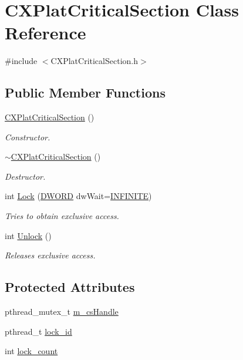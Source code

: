 \hypertarget{class_c_x_plat_critical_section}{\section{\-C\-X\-Plat\-Critical\-Section \-Class \-Reference}
\label{class_c_x_plat_critical_section}
}


{\ttfamily \#include $<$\-C\-X\-Plat\-Critical\-Section.\-h$>$}

\subsection*{\-Public \-Member \-Functions}
\begin{DoxyCompactItemize}
\item 
\hyperlink{class_c_x_plat_critical_section_a8188427bafd98f8778ecfbac5e4d962e}{\-C\-X\-Plat\-Critical\-Section} ()
\begin{DoxyCompactList}\small\item\em \-Constructor. \end{DoxyCompactList}\item 
\hyperlink{class_c_x_plat_critical_section_a17fee86e9af86ff7f2d922a77779651a}{$\sim$\-C\-X\-Plat\-Critical\-Section} ()
\begin{DoxyCompactList}\small\item\em \-Destructor. \end{DoxyCompactList}\item 
int \hyperlink{class_c_x_plat_critical_section_a09abc6317892511112edf7b8978ef670}{\-Lock} (\hyperlink{_x_plat_8h_aa39b39d94407451a6ec0226479db68cf}{\-D\-W\-O\-R\-D} dw\-Wait=\hyperlink{_x_plat_8h_aa84a29002ab81c719c0d07bb446296e0}{\-I\-N\-F\-I\-N\-I\-T\-E})
\begin{DoxyCompactList}\small\item\em \-Tries to obtain exclusive access. \end{DoxyCompactList}\item 
int \hyperlink{class_c_x_plat_critical_section_abc3ddf88e89230c7c97e98af9bd7c707}{\-Unlock} ()
\begin{DoxyCompactList}\small\item\em \-Releases exclusive access. \end{DoxyCompactList}\end{DoxyCompactItemize}
\subsection*{\-Protected \-Attributes}
\begin{DoxyCompactItemize}
\item 
pthread\-\_\-mutex\-\_\-t \hyperlink{class_c_x_plat_critical_section_aa7bacade5b04643e1a50122a0ba38fc5}{m\-\_\-cs\-Handle}
\item 
pthread\-\_\-t \hyperlink{class_c_x_plat_critical_section_a90276ecb4828f7c51166fc6588e31d22}{lock\-\_\-id}
\item 
int \hyperlink{class_c_x_plat_critical_section_a0bc1b3ef29deaac5438dd6ab245c0b9d}{lock\-\_\-count}
\end{DoxyCompactItemize}
